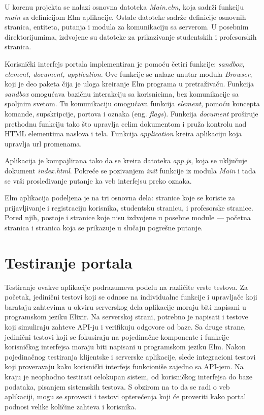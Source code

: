 \documentclass[12pt,oneside]{memoir}
\begin{document}
\par U korenu projekta se nalazi osnovna datoteka \emph{Main.elm}, koja sadrži funkciju \emph{main} sa definicijom Elm aplikacije. Ostale datoteke sadrže definicije osnovnih stranica, entiteta, putanja i modula za komunikaciju sa serverom. U posebnim direktorijumima, izdvojene su datoteke za prikazivanje studentskih i profesorskih stranica. 
\par Korisnički interfejs portala implementiran je pomoću četiri funkcije: \emph{sandbox, element, document, application}. Ove funkcije se nalaze unutar modula \emph{Browser}, koji je deo paketa čija je uloga kreiranje Elm programa u pretraživaču. Funkcija \emph{sandbox} omogućava bazičnu interakciju sa korisnicima, bez komunikacije sa spoljnim svetom. Tu komunikaciju omogućava funkcija \emph{element}, pomoću koncepta komande, supskripcije, portova i oznaka (eng. \emph{flags}). Funkcija \emph{document} proširuje prethodnu funkciju tako što upravlja celim dokumentom i pruža kontrolu nad HTML elementima naslova i tela. Funkcija \emph{application} kreira aplikaciju koja upravlja url promenama. 
\par Aplikacija je kompajlirana tako da se kreira datoteka \emph{app.js}, koja se uključuje dokument \emph{index.html}. Pokreće se pozivanjem \emph{init} funkcije iz modula \emph{Main} i tada se vrši prosleđivanje putanje ka veb interfejsu preko oznaka. 
\par Elm aplikacija podeljena je na tri osnovna dela: stranice koje se koriste za prijavljivanje i registraciju korisnika, studentsku stranicu, i profesorske stranice. Pored njih, postoje i stranice koje nisu izdvojene u posebne module --- početna stranica i stranica koja se prikazuje u slučaju pogrešne putanje.


\section{Testiranje portala}
\par Testiranje ovakve aplikacije podrazumeva podelu na različite vrste testova. Za početak, jedinični testovi koji se odnose na individualne funkcije i upravljače koji barataju zahtevima u okviru serverskog dela aplikacije moraju biti napisani u programskom jeziku Elixir. Na serverskoj strani, potrebno je napisati i testove koji simuliraju zahteve API-ju i verifikuju odgovore od baze. Sa druge strane, jedinični testovi koji se fokusiraju na pojedinačne komponente i funkcije korisničkog interfejsa moraju biti napisani u programskom jeziku Elm. Nakon pojedinačnog testiranja klijentske i serverske aplikacije, slede integracioni testovi koji proveravaju kako korisnički interfejs funkcioniše zajedno sa API-jem. Na kraju je neophodno testirati celokupan sistem, od korisničkog interfejsa do baze podataka, pisanjem sistemskih testova. S obzirom na to da se radi o veb aplikaciji, mogu se sprovesti i testovi opterećenja koji će proveriti kako portal podnosi velike količine zahteva i korisnika. 
\end{document}
